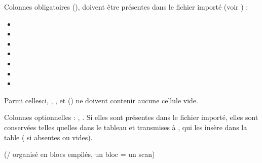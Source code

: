 \documentclass[letterpaper,10pt,english]{sphinxmanual}
\begin{document}
\sphinxAtStartPar
Colonnes obligatoires (), doivent être présentes dans le fichier importé
(voir ) :
\begin{itemize}
\item {} 
\sphinxAtStartPar
{}

\item {} 
\sphinxAtStartPar
{}

\item {} 
\sphinxAtStartPar
{}

\item {} 
\sphinxAtStartPar
{}

\item {} 
\sphinxAtStartPar
{}

\item {} 
\sphinxAtStartPar
{}

\item {} 
\sphinxAtStartPar
{}

\end{itemize}

\sphinxAtStartPar
Parmi celles\sphinxhyphen{}ci, , ,  et 
() ne doivent contenir aucune cellule vide.

\sphinxAtStartPar
Colonnes optionnelles : , . Si elles sont présentes dans le
fichier importé, elles sont conservées telles quelles dans le tableau et
transmises à {\hyperref[\detokenize{api:utils.loading_MS1.DB_MS1}]{}}, qui les insère dans la table
 ( si absentes ou vides).

\sphinxAtStartPar
{} (/ organisé en blocs empilés, un bloc = un scan)
\end{document}
